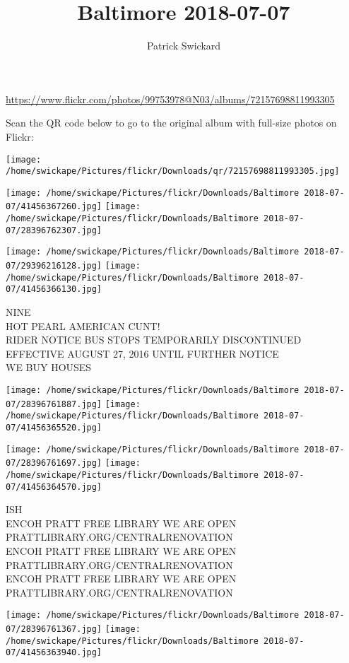 \documentclass[10pt,letterpaper]{article}
\title{Baltimore 2018-07-07}
\author{Patrick Swickard}
\date{}
\begin{document}
\maketitle

\url{https://www.flickr.com/photos/99753978@N03/albums/72157698811993305}

Scan the QR code below to go to the original album with full-size photos on Flickr:

\texttt{[image: /home/swickape/Pictures/flickr/Downloads/qr/72157698811993305.jpg]}
\pagebreak

\texttt{[image: /home/swickape/Pictures/flickr/Downloads/Baltimore 2018-07-07/41456367260.jpg]}
\texttt{[image: /home/swickape/Pictures/flickr/Downloads/Baltimore 2018-07-07/28396762307.jpg]}

\texttt{[image: /home/swickape/Pictures/flickr/Downloads/Baltimore 2018-07-07/29396216128.jpg]}
\texttt{[image: /home/swickape/Pictures/flickr/Downloads/Baltimore 2018-07-07/41456366130.jpg]}

NINE\\
HOT PEARL AMERICAN CUNT!\\
RIDER NOTICE BUS STOPS TEMPORARILY DISCONTINUED EFFECTIVE AUGUST 27, 2016 UNTIL FURTHER NOTICE\\
WE BUY HOUSES
\pagebreak

\texttt{[image: /home/swickape/Pictures/flickr/Downloads/Baltimore 2018-07-07/28396761887.jpg]}
\texttt{[image: /home/swickape/Pictures/flickr/Downloads/Baltimore 2018-07-07/41456365520.jpg]}

\texttt{[image: /home/swickape/Pictures/flickr/Downloads/Baltimore 2018-07-07/28396761697.jpg]}
\texttt{[image: /home/swickape/Pictures/flickr/Downloads/Baltimore 2018-07-07/41456364570.jpg]}

ISH\\
ENCOH PRATT FREE LIBRARY WE ARE OPEN PRATTLIBRARY.ORG/CENTRALRENOVATION\\
ENCOH PRATT FREE LIBRARY WE ARE OPEN PRATTLIBRARY.ORG/CENTRALRENOVATION\\
ENCOH PRATT FREE LIBRARY WE ARE OPEN PRATTLIBRARY.ORG/CENTRALRENOVATION
\pagebreak

\texttt{[image: /home/swickape/Pictures/flickr/Downloads/Baltimore 2018-07-07/28396761367.jpg]}
\texttt{[image: /home/swickape/Pictures/flickr/Downloads/Baltimore 2018-07-07/41456363940.jpg]}
\end{document}
